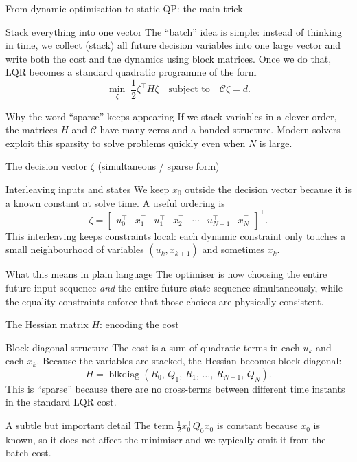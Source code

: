 \documentclass[aspectratio=169,11pt]{beamer}
\newcommand{\blkdiag}{\operatorname{blkdiag}}
\begin{document}
\begin{frame}{From dynamic optimisation to static QP: the main trick}
\begin{block}{Stack everything into one vector}
The ``batch'' idea is simple: instead of thinking in time, we collect (stack) all future decision variables into one large vector and write both the cost and the dynamics using block matrices.
Once we do that, LQR becomes a standard quadratic programme of the form
\[
\min_{\zeta}\;\frac{1}{2}\zeta^\top H\zeta\quad\text{subject to}\quad \mathcal{C}\zeta=d.
\]
\end{block}

\begin{alertblock}{Why the word ``sparse'' keeps appearing}
If we stack variables in a clever order, the matrices $H$ and $\mathcal{C}$ have many zeros and a banded structure. Modern solvers exploit this sparsity to solve problems quickly even when $N$ is large.
\end{alertblock}
\end{frame}

\begin{frame}{The decision vector $\zeta$ (simultaneous / sparse form)}
\begin{block}{Interleaving inputs and states}
We keep $x_0$ outside the decision vector because it is a known constant at solve time. A useful ordering is
\[
\zeta = \begin{bmatrix} u_0^\top & x_1^\top & u_1^\top & x_2^\top & \cdots & u_{N-1}^\top & x_N^\top \end{bmatrix}^\top.
\]
This interleaving keeps constraints local: each dynamic constraint only touches a small neighbourhood of variables $(u_k, x_{k+1})$ and sometimes $x_k$.
\end{block}

\begin{block}{What this means in plain language}
The optimiser is now choosing the entire future input sequence \emph{and} the entire future state sequence simultaneously, while the equality constraints enforce that those choices are physically consistent.
\end{block}
\end{frame}

\begin{frame}{The Hessian matrix $H$: encoding the cost}
\begin{block}{Block-diagonal structure}
The cost is a sum of quadratic terms in each $u_k$ and each $x_k$. Because the variables are stacked, the Hessian becomes block diagonal:
\[
H = \blkdiag(R_0,\,Q_1,\,R_1,\,\dots,\,R_{N-1},\,Q_N).
\]
This is ``sparse'' because there are no cross-terms between different time instants in the standard LQR cost.
\end{block}

\begin{alertblock}{A subtle but important detail}
The term $\tfrac12 x_0^\top Q_0 x_0$ is constant because $x_0$ is known, so it does not affect the minimiser and we typically omit it from the batch cost.
\end{alertblock}
\end{frame}
\end{document}
